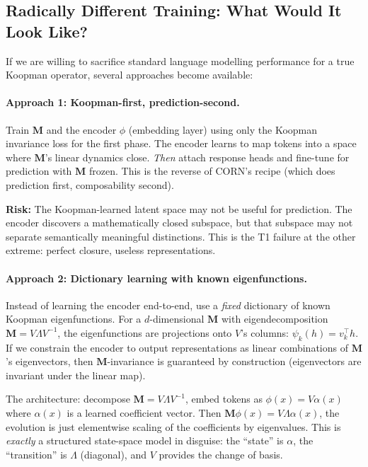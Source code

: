 \documentclass[11pt, a4paper]{article}
\newcommand{\M}{\mathbf{M}}
\theoremstyle{plain}
\theoremstyle{remark}
\begin{document}
\subsection{Radically Different Training: What Would It Look Like?}

If we are willing to sacrifice standard language modelling performance for a true Koopman operator, several approaches become available:

\paragraph{Approach 1: Koopman-first, prediction-second.}
Train $\M$ and the encoder $\phi$ (embedding layer) using only the Koopman invariance loss for the first phase.
The encoder learns to map tokens into a space where $\M$'s linear dynamics close.
\emph{Then} attach response heads and fine-tune for prediction with $\M$ frozen.
This is the reverse of CORN's recipe (which does prediction first, composability second).

\textbf{Risk:} The Koopman-learned latent space may not be useful for prediction.
The encoder discovers a mathematically closed subspace, but that subspace may not separate semantically meaningful distinctions.
This is the T1 failure at the other extreme: perfect closure, useless representations.

\paragraph{Approach 2: Dictionary learning with known eigenfunctions.}
Instead of learning the encoder end-to-end, use a \emph{fixed} dictionary of known Koopman eigenfunctions.
For a $d$-dimensional $\M$ with eigendecomposition $\M = V \Lambda V^{-1}$, the eigenfunctions are projections onto $V$'s columns: $\psi_k(h) = v_k^\top h$.
If we constrain the encoder to output representations as linear combinations of $\M$'s eigenvectors, then $\M$-invariance is guaranteed by construction (eigenvectors are invariant under the linear map).

The architecture: decompose $\M = V \Lambda V^{-1}$, embed tokens as $\phi(x) = V \alpha(x)$ where $\alpha(x)$ is a learned coefficient vector.
Then $\M \phi(x) = V \Lambda \alpha(x)$, the evolution is just elementwise scaling of the coefficients by eigenvalues.
This is \emph{exactly} a structured state-space model in disguise: the ``state'' is $\alpha$, the ``transition'' is $\Lambda$ (diagonal), and $V$ provides the change of basis.
\end{document}
